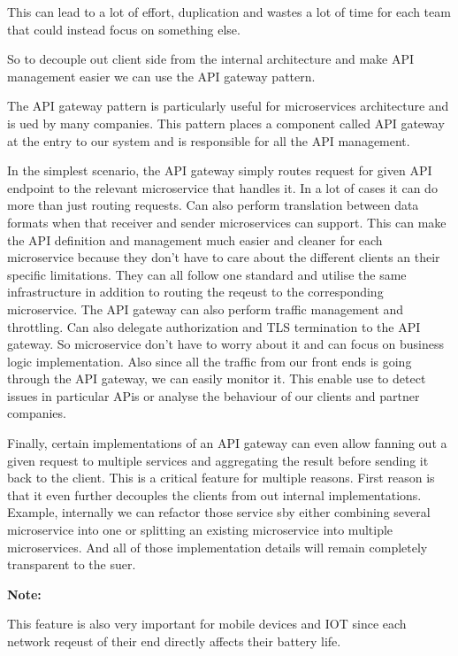 \documentclass[a4paper, 11pt]{book}
\newenvironment{note}{
    \begin{siderule}
        \textbf{Note: }
        }{
    \end{siderule}}
\begin{document}
    This can lead to a lot of effort, duplication and wastes a lot of time for each team that could instead focus on something else.

    So to decouple out client side from the internal architecture and make API management easier we can use the API gateway pattern.

    The API gateway pattern is particularly useful for microservices architecture and is ued by many companies.
    This pattern places a component called API gateway at the entry to our system and is responsible for all the API management.

    In the simplest scenario, the API gateway simply routes request for given API endpoint to the relevant microservice that handles it.
    In a lot of cases it can do more than just routing requests.
    Can also perform translation between data formats when that receiver and sender microservices can support.
    This can make the API definition and management much easier and cleaner for each microservice because they don't have to care about the different clients an their specific limitations.
    They can all follow one standard and utilise the same infrastructure in addition to routing the reqeust to the corresponding microservice.
    The API gateway can also perform traffic management and throttling.
    Can also delegate authorization and TLS termination to the API gateway.
    So microservice don't have to worry about it and can focus on business logic implementation.
    Also since all the traffic from our front ends is going through the API gateway, we can easily monitor it.
    This enable use to detect issues in particular APis or analyse the behaviour of our clients and partner companies.

    Finally, certain implementations of an API gateway can even allow fanning out a given request to multiple services and aggregating the result before sending it back to the client.
    This is a critical feature for multiple reasons.
    First reason is that it even further decouples the clients from out internal implementations.
    Example, internally we can refactor those service sby either combining several microservice into one or splitting an existing microservice into multiple microservices.
    And all of those implementation details will remain completely transparent to the suer.

    \begin{note}
        This feature is also very important for mobile devices and IOT since each network reqeust of their end directly affects their battery life.
    \end{note}
\end{document}
